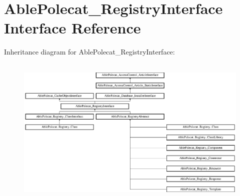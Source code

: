 \hypertarget{interface_able_polecat___registry_interface}{}\section{Able\+Polecat\+\_\+\+Registry\+Interface Interface Reference}
\label{interface_able_polecat___registry_interface}
Inheritance diagram for Able\+Polecat\+\_\+\+Registry\+Interface\+:\begin{figure}[H]
\begin{center}
\leavevmode
\includegraphics[height=7.225806cm]{interface_able_polecat___registry_interface}
\end{center}
\end{figure}
